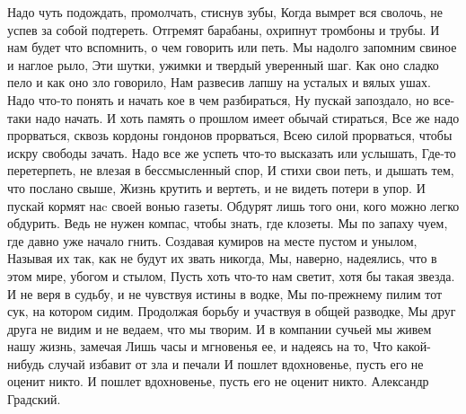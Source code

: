 \begin{multicols}{2}
\vspace{0.5cm}
\obeycr\noindent
Надо чуть подождать, промолчать, стиснув зубы,
Когда вымрет вся сволочь, не успев за собой подтереть.
Отгремят барабаны, охрипнут тромбоны и трубы.
И нам будет что вспомнить, о чем говорить или петь.
\smallskip
Мы надолго запомним свиное и наглое рыло,
Эти шутки, ужимки и твердый уверенный шаг.
Как оно сладко пело и как оно зло говорило,
Нам развесив лапшу на усталых и вялых ушах.
\smallskip
Надо что-то понять и начать кое в чем разбираться,
Ну пускай запоздало, но все-таки надо начать.
И хоть память о прошлом имеет обычай стираться,
Все же надо прорваться, сквозь кордоны гондонов прорваться,
Всею силой прорваться, чтобы искру свободы зачать.
\smallskip
Надо все же успеть что-то высказать или услышать,
Где-то перетерпеть, не влезая в бессмысленный спор,
И стихи свои петь, и дышать тем, что послано свыше,
Жизнь крутить и вертеть, и не видеть потери в упор.
И пускай кормят наc своей вонью газеты.
\smallskip
Обдурят лишь того они, кого можно легко обдурить.
Ведь не нужен компас, чтобы знать, где клозеты.
Мы по запаху чуем, где давно уже начало гнить.
\smallskip
Создавая кумиров на месте пустом и унылом,
Называя их так, как не будут их звать никогда,
Мы, наверно, надеялись, что в этом мире, убогом и стылом,
Пусть хоть что-то нам светит, хотя бы такая звезда.
\smallskip
И не веря в судьбу, и не чувствуя истины в водке,
Мы по-прежнему пилим тот сук, на котором сидим.
Продолжая борьбу и участвуя в общей разводке,
Мы друг друга не видим и не ведаем, что мы творим.
\smallskip
И в компании сучьей мы живем нашу жизнь, замечая
Лишь часы и мгновенья ее, и надеясь на то,
Что какой-нибудь случай избавит от зла и печали
И пошлет вдохновенье, пусть его не оценит никто.
И пошлет вдохновенье, пусть его не оценит никто.
\smallskip
Александр Градский.
\restorecr
\end{multicols}
